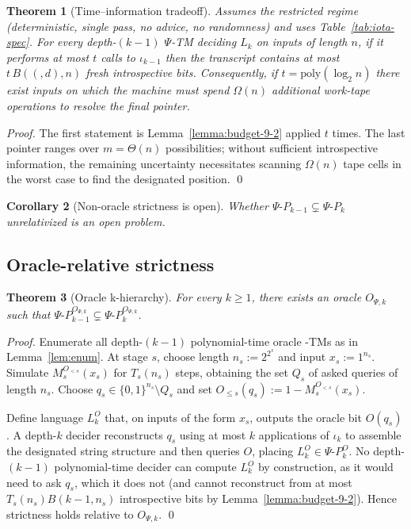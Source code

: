\documentclass[11pt]{article}
\let\oldlog\log
\renewcommand{\log}{\oldlog_2}
\newtheorem{theorem}{Theorem}[section]
\newtheorem{corollary}[theorem]{Corollary}
\theoremstyle{plain}
\theoremstyle{definition}
\newcommand{\PSi}{\Psi}
\newcommand{\bits}{\{0,1\}}
\newcommand{\B}[2]{B(#1,#2)}  %
\begin{document}
\begin{theorem}[Time--information tradeoff]
\label{thm:tradeoff}
Assumes the restricted regime (deterministic, single pass, no advice, no randomness) and uses Table~\ref{tab:iota-spec}.
For every depth-$(k{-}1)$ $\Psi$-TM deciding $L_k$ on inputs of length $n$, if it performs at most $t$ calls to $\iota_{k-1}$ then the transcript contains at most $t\,\B(d,n)$ fresh introspective bits. Consequently, if $t=\mathrm{poly}(\log n)$ there exist inputs on which the machine must spend $\Omega(n)$ additional work-tape operations to resolve the final pointer.
\end{theorem}
\begin{proof}
The first statement is Lemma~\ref{lemma:budget-9-2} applied $t$ times. The last pointer ranges over $m=\Theta(n)$ possibilities; without sufficient introspective information, the remaining uncertainty necessitates scanning $\Omega(n)$ tape cells in the worst case to find the designated position. \qed
\end{proof}

\begin{corollary}[Non-oracle strictness is open]
\label{cor:strictness-open}
Whether $\Psi\text{-}P_{k-1}\subsetneq \Psi\text{-}P_k$ unrelativized is an open problem.
\end{corollary}

\subsection{Oracle-relative strictness}
\label{sec:oracle-strictness}

\begin{theorem}[Oracle k-hierarchy]
\label{thm:oracle-k-hierarchy}
For every $k\ge1$, there exists an oracle $O_{\PSi,k}$ such that $\Psi\text{-}P_{k-1}^{O_{\PSi,k}} \subsetneq \Psi\text{-}P_{k}^{O_{\PSi,k}}$.
\end{theorem}
\begin{proof}
Enumerate all depth-$(k{-}1)$ polynomial-time oracle \PSi-TMs as in Lemma~\ref{lem:enum}. At stage $s$, choose length $n_s:=2^{2^s}$ and input $x_s:=1^{n_s}$. Simulate $M_s^{O_{<s}}(x_s)$ for $T_s(n_s)$ steps, obtaining the set $Q_s$ of asked queries of length $n_s$. Choose $q_s\in\bits^{n_s}\setminus Q_s$ and set $O_{\le s}(q_s):=1-M_s^{O_{<s}}(x_s)$.

Define language $L_k^{O}$ that, on inputs of the form $x_s$, outputs the oracle bit $O(q_s)$. A depth-$k$ decider reconstructs $q_s$ using at most $k$ applications of $\iota_k$ to assemble the designated string structure and then queries $O$, placing $L_k^{O}\in\Psi\text{-}P_{k}^{O}$. No depth-$(k{-}1)$ polynomial-time decider can compute $L_k^{O}$ by construction, as it would need to ask $q_s$, which it does not (and cannot reconstruct from at most $T_s(n_s) B(k{-}1,n_s)$ introspective bits by Lemma~\ref{lemma:budget-9-2}). Hence strictness holds relative to $O_{\PSi,k}$. \qed
\end{proof}
\end{document}
